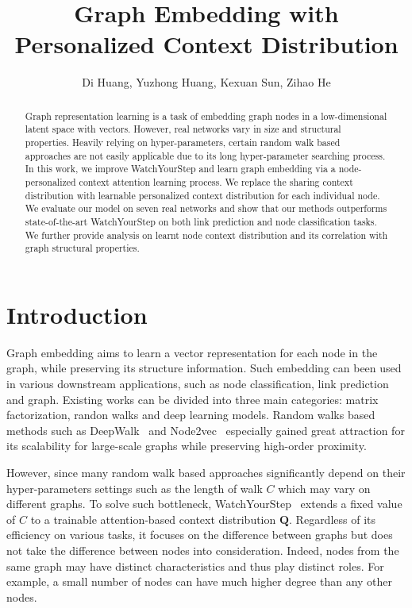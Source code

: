 \documentclass{article}
\title{Graph Embedding with Personalized Context Distribution}
\author{
Di Huang, Yuzhong Huang, Kexuan Sun, Zihao He}
\begin{document}
\maketitle

\begin{abstract}
Graph representation learning is a task of embedding graph nodes in a low-dimensional latent space with vectors. 
However, real networks vary in size and structural properties. Heavily relying on hyper-parameters, certain random walk based approaches are not easily applicable due to its long hyper-parameter searching process. In this work, we improve WatchYourStep and learn graph embedding via a node-personalized context attention learning process. We replace the sharing context distribution with learnable personalized context distribution for each individual node. We evaluate our model on seven real networks and show that our methods outperforms state-of-the-art WatchYourStep on both link prediction and node classification tasks. We further provide analysis on learnt node context distribution and its correlation with graph structural properties.
\end{abstract}

\section{Introduction}

Graph embedding aims to learn a vector representation for each node in the graph, while preserving its structure information. Such embedding can been used in various downstream applications, such as node classification, link prediction and graph. Existing works can be divided into three main categories: matrix factorization, randon walks and deep learning models. Random walks based methods such as DeepWalk~\cite{perozzi2014deepwalk} and Node2vec~\cite{grover2016node2vec} especially gained great attraction for its scalability for large-scale graphs while preserving high-order proximity.

However, since many random walk based approaches significantly depend on their hyper-parameters settings such as the length of walk $C$ which may vary on different graphs. To solve such bottleneck, WatchYourStep~\cite{abu2018watch} extends a fixed value of $C$ to a trainable attention-based context distribution $\mathbf{Q}$. Regardless of its efficiency on various tasks, it focuses on the difference between graphs but does not take the difference between nodes into consideration. Indeed, nodes from the same graph may have distinct characteristics and thus play distinct roles. For example, a small number of nodes can have much higher degree than any other nodes.
\end{document}

